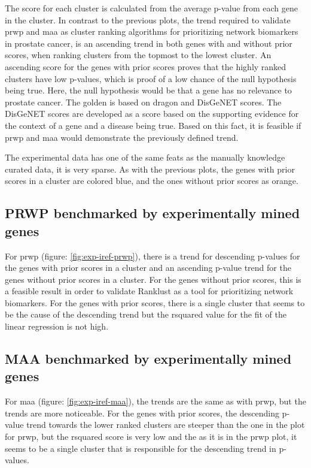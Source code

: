 The score for each cluster is calculated from the average p-value from each gene
in the cluster. In contrast to the previous plots, the trend required to
validate \gls{prwp} and \gls{maa} as cluster ranking algorithms for prioritizing
network biomarkers in prostate cancer, is an ascending trend in both genes with
and without prior scores, when ranking clusters from the topmost to the lowest
cluster. An ascending score for the genes with prior scores proves that the
highly ranked clusters have low p-values, which is proof of a low chance of the
null hypothesis being true. Here, the null hypothesis would be that a gene has
no relevance to prostate cancer. The \gls{golden} is based on \gls{dragon} and
DisGeNET scores. The DisGeNET scores are developed as a score based on the
supporting evidence for the context of a gene and a disease being
true\cite{disgenet}. Based on this fact, it is feasible if \gls{prwp} and
\gls{maa} would demonstrate the previously defined trend.

The experimental data has one of the same feats as the manually knowledge
curated data, it is very sparse. As with the previous plots, the genes with
prior scores in a cluster are colored blue, and the ones without prior scores as
orange.

\subsection{PRWP benchmarked by experimentally mined genes}
For \gls{prwp} (figure: \ref{fig:exp-iref-prwp}), there is a trend for descending
p-values for the genes with prior scores in a cluster and an ascending p-value
trend for the genes without prior scores in a cluster. For the genes without
prior scores, this is a feasible result in order to validate Ranklust as a tool
for prioritizing network biomarkers. For the genes with prior scores, there is
a single cluster that seems to be the cause of the descending trend but the
\gls{rsquared} value for the fit of the linear regression is not high.

\subsection{MAA benchmarked by experimentally mined genes}
For \gls{maa} (figure: \ref{fig:exp-iref-maa}), the trends are the same as with
\gls{prwp}, but the trends are more noticeable. For the genes with prior scores,
the descending p-value trend towards the lower ranked clusters are steeper than
the one in the plot for \gls{prwp}, but the \gls{rsquared} score is very low and
the as it is in the \gls{prwp} plot, it seems to be a single cluster that is
responsible for the descending trend in p-values.

